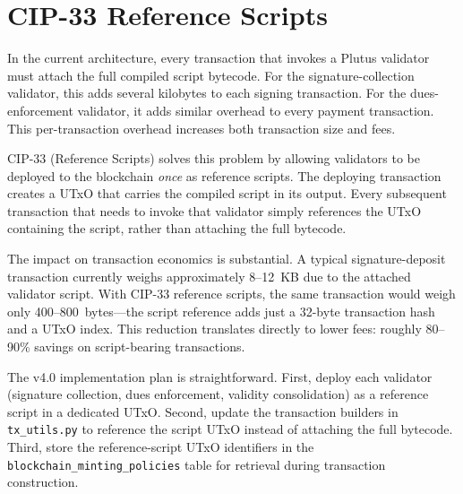 \section{CIP-33 Reference Scripts}
\label{sec:cip33}

In the current architecture, every transaction that invokes a Plutus
validator must attach the full compiled script bytecode.  For the
signature-collection validator, this adds several kilobytes to each signing
transaction.  For the dues-enforcement validator, it adds similar overhead
to every payment transaction.  This per-transaction overhead increases both
transaction size and fees.

CIP-33 (Reference Scripts) solves this problem by allowing validators to be
deployed to the blockchain \emph{once} as reference scripts.  The deploying
transaction creates a UTxO that carries the compiled script in its output.
Every subsequent transaction that needs to invoke that validator simply
references the UTxO containing the script, rather than attaching the full
bytecode.

The impact on transaction economics is substantial.  A typical
signature-deposit transaction currently weighs approximately 8--12~KB due to
the attached validator script.  With CIP-33 reference scripts, the same
transaction would weigh only 400--800~bytes---the script reference adds just
a 32-byte transaction hash and a UTxO index.  This reduction translates
directly to lower fees: roughly 80--90\% savings on script-bearing
transactions.

The v4.0 implementation plan is straightforward.  First, deploy each
validator (signature collection, dues enforcement, validity consolidation)
as a reference script in a dedicated UTxO.  Second, update the transaction
builders in \texttt{tx\_utils.py} to reference the script UTxO instead of
attaching the full bytecode.  Third, store the reference-script UTxO
identifiers in the \texttt{blockchain\_minting\_policies} table for
retrieval during transaction construction.


